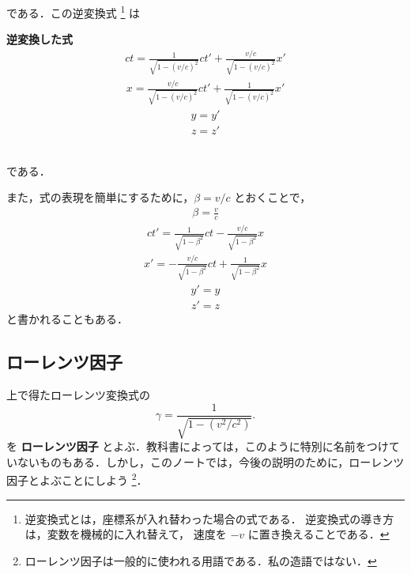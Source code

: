 である．この逆変換式
    \footnote{
        逆変換式とは，座標系が入れ替わった場合の式である．
        逆変換式の導き方は，変数を機械的に入れ替えて，
        速度を $-v$ に置き換えることである．
    }
は\\
\begin{itembox}[l]{\textbf{逆変換した式}}
    \begin{align}
    ct=\frac{1}{\sqrt{ 1-(v/c)^{2} }} ct' +\frac{v/c}{\sqrt{ 1-(v/c)^{2} }} x'
    \end{align}
    \begin{align}
    x=\frac{v/c}{\sqrt{ 1-(v/c)^{2} }}ct'+\frac{1}{\sqrt{ 1-(v/c)^{2} }} x'
    \end{align}
    \begin{align}
    y=y'
    \end{align}
    \begin{align}
    z=z'
    \end{align}
\end{itembox}\\
である．

また，式の表現を簡単にするために，$\beta = v/c$ とおくことで，
\begin{align}
\beta = \frac{v}{c}
\end{align}
\begin{align}
ct'=\frac{1}{\sqrt{ 1-\beta^{2} }} ct -\frac{v/c}{\sqrt{ 1-\beta^{2} }} x
\end{align}
\begin{align}
x'=-\frac{v/c}{\sqrt{ 1-\beta^{2} }}ct+\frac{1}{\sqrt{ 1-\beta^{2} }} x
\end{align}
\begin{align}
y'=y
\end{align}
\begin{align}
z'=z
\end{align}
と書かれることもある．

\subsection{ローレンツ因子}
上で得たローレンツ変換式の
\begin{equation*}
     \gamma = \frac{1}{\sqrt{1-\left(v^{2}/c^{2}\right)}}.
\end{equation*}
を \textbf{ローレンツ因子} とよぶ．教科書によっては，このように特別に名前をつけていないものもある．しかし，このノートでは，今後の説明のために，ローレンツ因子とよぶことにしよう
    \footnote{
        ローレンツ因子は一般的に使われる用語である．私の造語ではない．
    }．

